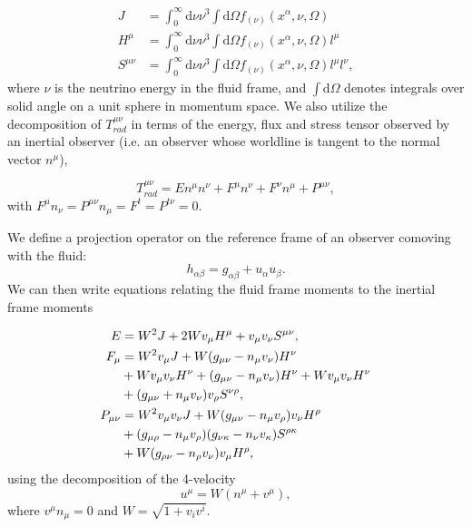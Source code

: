 \begin{align}
  J &= \int^\infty_0 \mathrm{d}\nu \nu^3 \int \mathrm{d}\Omega f_{(\nu)}(x^{\alpha}, \nu, \Omega) \\
  H^\mu &= \int^\infty_0 \mathrm{d}\nu \nu^3 \int \mathrm{d}\Omega f_{(\nu)}(x^{\alpha}, \nu, \Omega) l^{\mu}\\
  S^{\mu\nu} &= \int^\infty_0 \mathrm{d}\nu \nu^3 \int \mathrm{d}\Omega f_{(\nu)}(x^{\alpha}, \nu, \Omega) l^{\mu}l^\nu,
\end{align}
%
where $\nu$ is the neutrino energy in the fluid frame, and $\int\mathrm{d}\Omega$ denotes integrals over solid angle on a unit sphere in momentum space.
%
%
We also utilize the decomposition of $T^{\mu\nu}_{rad}$ in terms of the energy, flux and stress tensor observed by an inertial observer (i.e. an observer whose worldline is tangent to the normal vector $n^\mu$),

\begin{equation}
  T^{\mu\nu}_{rad} = En^\mu n^\nu + F^\mu n^\nu + F^\nu n^\mu + P^{\mu\nu},
\end{equation}
%
with $F^\mu n_\nu = P^{\mu\nu}n_\mu = F^t = P^{t\nu} = 0$.%

We define a projection operator on the reference frame of an observer comoving with the fluid:
%
\begin{equation}
  h_{\alpha\beta} = g_{\alpha\beta} + u_\alpha u_\beta.
\end{equation}
%
We can then write equations relating the fluid frame moments to the inertial frame moments

\begin{align}
  E &= W^2 J + 2 W v_\mu H^\mu + v_\mu v_\nu S^{\mu\nu}, \\
  F_\mu &= W^2 v_\mu J + W(g_{\mu\nu} - n_\mu v_\nu) H^\nu \\
  &+ W v_\mu v_\nu H^\nu + (g_{\mu\nu} - n_\mu v_\nu) H^\nu + Wv_\mu v_\nu H^\nu \notag\\
  &+ (g_{\mu\nu} + n_\mu v_\nu) v_\rho S^{\nu\rho}, \notag\\
  P_{\mu\nu} &= W^2 v_\mu v_\nu J + W(g_{\mu\nu} - n_\mu v_\rho)v_\nu H^\rho \\
  &+ (g_{\mu\rho} - n_\mu v_\rho)(g_{\nu\kappa} - n_\nu v_\kappa)S^{\rho\kappa} \notag \\
  &+ W(g_{\rho\nu} - n_\rho v_\nu) v_\mu H^\rho, \notag
\end{align}
%
using the decomposition of the 4-velocity
%
\begin{equation}
  \label{eqn:vel_decomp}
  u^\mu = W(n^\mu + v^\mu),
\end{equation}
%
where $v^\mu n_\mu = 0$ and $W = \sqrt{1 + v_i v^i}$.

